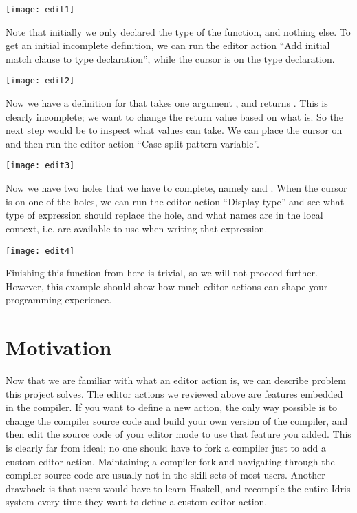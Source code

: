 \vspace{1em}
\texttt{[image: edit1]}

Note that initially we only declared the type of the function, and nothing
else. To get an initial incomplete definition, we can run the editor action
``Add initial match clause to type declaration'', while the cursor is on the
type declaration.

\vspace{1em}
\texttt{[image: edit2]}

Now we have a definition for  that takes one argument , and
returns . This is clearly incomplete; we want to change
the return value based on what  is. So the next step would be to inspect
what values  can take. We can place the cursor on  and then run the
editor action ``Case split pattern variable''.

\vspace{1em}
\texttt{[image: edit3]}

Now we have two holes that we have to complete, namely  and
. When the cursor is on one of the holes, we can run the
editor action ``Display type'' and see what type of expression should replace
the hole, and what names are in the local context, i.e. are available to use
when writing that expression.

\vspace{1em}
\texttt{[image: edit4]}

Finishing this function from here is trivial, so we will not proceed further.
However, this example should show how much editor actions can shape your
programming experience.

\section{Motivation}

Now that we are familiar with what an editor action is, we can describe problem
this project solves. The editor actions we reviewed above are features embedded
in the compiler. If you want to define a new action, the only way possible is
to change the compiler source code and build your own version of the compiler,
and then edit the source code of your editor mode to use that feature you
added. This is clearly far from ideal; no one should have to fork a compiler
just to add a custom editor action. Maintaining a compiler fork and
navigating through the compiler source code are usually not in the skill sets
of most users.
Another drawback is that users would have to learn Haskell, and recompile the
entire Idris system every time they want to define a custom editor action.

